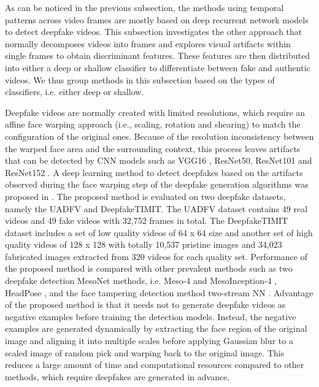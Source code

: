 As can be noticed in the previous subsection, the methods using temporal patterns across video frames are mostly based on deep recurrent network models to detect deepfake videos. This subsection investigates the other approach that normally decomposes videos into frames and explores visual artifacts within single frames to obtain discriminant features. These features are then distributed into either a deep or shallow classifier to differentiate between fake and authentic videos. We thus group methods in this subsection based on the types of classifiers, i.e. either deep or shallow.

Deepfake videos are normally created with limited resolutions, which require an affine face warping approach (i.e., scaling, rotation and shearing) to match the configuration of the original ones. Because of the resolution inconsistency between the warped face area and the surrounding context, this process leaves artifacts that can be detected by CNN models such as VGG16 , ResNet50, ResNet101 and ResNet152 . A deep learning method to detect deepfakes based on the artifacts observed during the face warping step of the deepfake generation algorithms was proposed in . The proposed method is evaluated on two deepfake datasets, namely the UADFV and DeepfakeTIMIT. The UADFV dataset  contains 49 real videos and 49 fake videos with 32,752 frames in total. The DeepfakeTIMIT dataset  includes a set of low quality videos of 64 x 64 size and another set of high quality videos of 128 x 128 with totally 10,537 pristine images and 34,023 fabricated images extracted from 320 videos for each quality set. Performance of the proposed method is compared with other prevalent methods such as two deepfake detection MesoNet methods, i.e. Meso-4 and MesoInception-4 , HeadPose , and the face tampering detection method two-stream NN . Advantage of the proposed method is that it needs not to generate deepfake videos as negative examples before training the detection models. Instead, the negative examples are generated dynamically by extracting the face region of the original image and aligning it into multiple scales before applying Gaussian blur to a scaled image of random pick and warping back to the original image. This reduces a large amount of time and computational resources compared to other methods, which require deepfakes are generated in advance.
